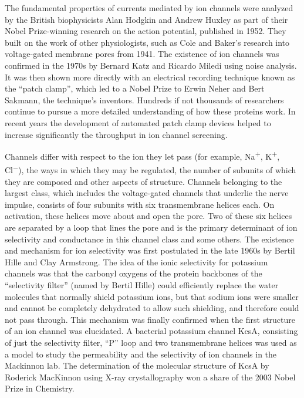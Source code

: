 The fundamental properties of currents mediated by ion channels were analyzed by the British biophysicists Alan Hodgkin and Andrew Huxley as part of their Nobel Prize-winning research on the action potential, published in 1952. They built on the work of other physiologists, such as Cole and Baker's research into voltage-gated membrane pores from 1941. The existence of ion channels was confirmed in the 1970s by Bernard Katz and Ricardo Miledi using noise analysis. It was then shown more directly with an electrical recording technique known as the ``patch clamp'', which led to a Nobel Prize to Erwin Neher and Bert Sakmann, the technique's inventors. Hundreds if not thousands of researchers continue to pursue a more detailed understanding of how these proteins work. In recent years the development of automated patch clamp devices helped to increase significantly the throughput in ion channel screening.

Channels differ with respect to the ion they let pass (for example, Na\textsuperscript{+}, K\textsuperscript{+}, Cl\textsuperscript{−}), the ways in which they may be regulated, the number of subunits of which they are composed and other aspects of structure. Channels belonging to the largest class, which includes the voltage-gated channels that underlie the nerve impulse, consists of four subunits with six transmembrane helices each. On activation, these helices move about and open the pore. Two of these six helices are separated by a loop that lines the pore and is the primary determinant of ion selectivity and conductance in this channel class and some others. The existence and mechanism for ion selectivity was first postulated in the late 1960s by Bertil Hille and Clay Armstrong. The idea of the ionic selectivity for potassium channels was that the carbonyl oxygens of the protein backbones of the ``selectivity filter'' (named by Bertil Hille) could efficiently replace the water molecules that normally shield potassium ions, but that sodium ions were smaller and cannot be completely dehydrated to allow such shielding, and therefore could not pass through. This mechanism was finally confirmed when the first structure of an ion channel was elucidated. A bacterial potassium channel KcsA, consisting of just the selectivity filter, ``P'' loop and two transmembrane helices was used as a model to study the permeability and the selectivity of ion channels in the Mackinnon lab. The determination of the molecular structure of KcsA by Roderick MacKinnon using X-ray crystallography won a share of the 2003 Nobel Prize in Chemistry.

